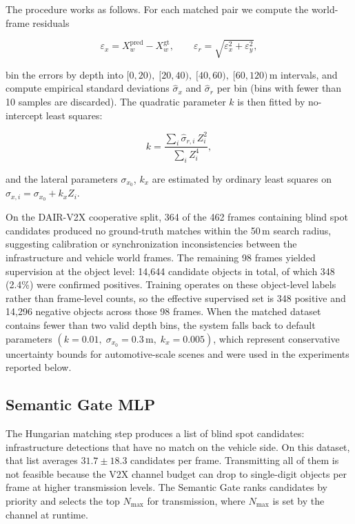 \documentclass[12pt]{article}
\begin{document}
\medskip
The procedure works as follows. For each matched pair we compute the world-frame residuals

\begin{equation}
    \varepsilon_x = X_w^{\text{pred}} - X_w^{\text{gt}}, \qquad
    \varepsilon_r = \sqrt{\varepsilon_x^2 + \varepsilon_y^2},
\end{equation}

\noindent bin the errors by depth into $[0,20),\;[20,40),\;[40,60),\;[60,120)$\,m intervals, and compute empirical standard deviations $\hat{\sigma}_x$ and $\hat{\sigma}_r$ per bin (bins with fewer than 10 samples are discarded). The quadratic parameter $k$ is then fitted by no-intercept least squares:

\begin{equation}
    k = \frac{\sum_i \hat{\sigma}_{r,i}\,Z_i^2}{\sum_i Z_i^4},
\end{equation}

\noindent and the lateral parameters $\sigma_{x_0}$, $k_x$ are estimated by ordinary least squares on $\hat{\sigma}_{x,i} = \sigma_{x_0} + k_x Z_i$.

\medskip
On the DAIR-V2X cooperative split, 364 of the 462 frames containing blind spot candidates produced no ground-truth matches within the 50\,m search radius, suggesting calibration or synchronization inconsistencies between the infrastructure and vehicle world frames. The remaining 98 frames yielded supervision at the object level: 14{,}644 candidate objects in total, of which 348 (2.4\%) were confirmed positives. Training operates on these object-level labels rather than frame-level counts, so the effective supervised set is 348 positive and 14{,}296 negative objects across those 98 frames. When the matched dataset contains fewer than two valid depth bins, the system falls back to default parameters $(k=0.01,\;\sigma_{x_0}=0.3\,\text{m},\;k_x=0.005)$, which represent conservative uncertainty bounds for automotive-scale scenes and were used in the experiments reported below.

\subsection{Semantic Gate MLP}
\label{sec:semantic_gate}

The Hungarian matching step produces a list of blind spot candidates: infrastructure detections that have no match on the vehicle side. On this dataset, that list averages $31.7 \pm 18.3$ candidates per frame. Transmitting all of them is not feasible because the V2X channel budget can drop to single-digit objects per frame at higher transmission levels. The Semantic Gate ranks candidates by priority and selects the top $N_{\max}$ for transmission, where $N_{\max}$ is set by the channel at runtime.
\end{document}
